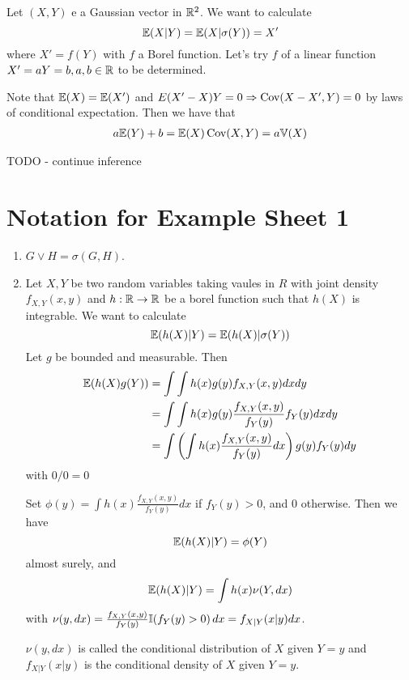 \begin{exmp}
  \label{defn:inequalities:7}
  Let $(X, Y)$ e a Gaussian vector in $\mathbb{R}^{2}$.  We want to calculate
  \begin{equation}
    \label{eq:21}
    \E{X | Y} = \E{X | \sigma(Y) } = X'
  \end{equation} where $X' = f(Y)$ with $f$ a Borel function.  Let's
  try $f$ of a linear function $X' = aY = b, a, b \in \mathbb{R}$ to be
  determined.

  Note that $\E{X} = \E{X'}$ and $E{(X' - X) Y} = 0 \Rightarrow
  \Cov{X-X'}{Y} = 0$ by laws of
  conditional expectation.  Then we have that
  \begin{align}
    \label{eq:22}
    a\E{Y} + b = \E{X}
    \Cov{X}{Y} = a \Var{X}
  \end{align}

  TODO - continue inference
\end{exmp}

\section{Notation for Example Sheet 1}
\label{sec:notat-example-sheet}

\begin{enumerate}
\item $G \vee H = \sigma(G, H)$.
\item Let $X, Y$ be two random variables taking vaules in $R$ with
  joint density $f_{X, Y}(x, y)$ and $h: \mathbb{R} \rightarrow \mathbb{R}$ be a borel
  function such that $h(X)$ is integrable.  We want to calculate
  \begin{equation}
    \label{eq:13}
    \E{h(X)|Y} = \E{h(X)|\sigma(Y)}
  \end{equation} Let $g$ be bounded and measurable.  Then
  \begin{align}
    \E{h(X) g(Y)} &= \int \int h(x) g(y) f_{X, Y}(x, y) dx dy \\
    &= \int \int h(x) g(y) \frac{f_{X, Y}(x, y)}{f_{Y}(y)} f_{Y}(y) dx
    dy \\
    &= \int \left( \int h(x) \frac{f_{X, Y}(x, y)}{f_{Y}(y)} dx
    \right) g(y) f_{Y}(y) dy
  \end{align} with $0/0 = 0$

  Set $\phi(y) =  \int h(x) \frac{f_{X, Y}(x, y)}{f_{Y}(y)} dx$ if
  $f_{Y}(y) > 0$, and 0 otherwise.  Then we have
  \begin{equation}
    \label{eq:16}
    \E{h(X) | Y} = \phi(Y)
  \end{equation} almost surely, and
  \begin{equation}
    \label{eq:23}
    \E{h(X) | Y} = \int h(x) \nu(Y, dx)
  \end{equation} with $\nu(y, dx) = \frac{f_{X, Y}(x,
    y)}{f_{Y}(y)}\I{f_{Y}(y) > 0} dx = f_{X|Y}(x|y) dx$.

  $\nu(y, dx)$ is called the conditional distribution of $X$ given $Y
  = y$ and $f_{X|Y}(x|y)$ is the conditional density of $X$ given $Y=y$.
\end{enumerate}
